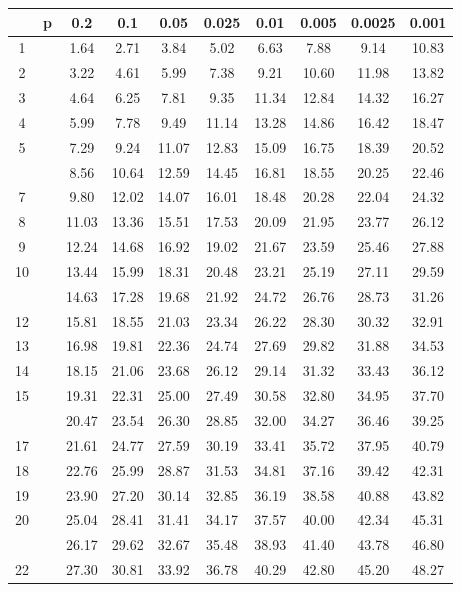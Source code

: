 \documentclass[
]{book}
\begin{document}
\begin{tabular}{cccccccccc}
\toprule
 & p & 0.2 & 0.1 & 0.05 & 0.025 & 0.01 & 0.005 & 0.0025 & 0.001\\
\midrule
1 &  & 1.64 & 2.71 & 3.84 & 5.02 & 6.63 & 7.88 & 9.14 & 10.83\\
2 &  & 3.22 & 4.61 & 5.99 & 7.38 & 9.21 & 10.60 & 11.98 & 13.82\\
3 &  & 4.64 & 6.25 & 7.81 & 9.35 & 11.34 & 12.84 & 14.32 & 16.27\\
4 &  & 5.99 & 7.78 & 9.49 & 11.14 & 13.28 & 14.86 & 16.42 & 18.47\\
5 &  & 7.29 & 9.24 & 11.07 & 12.83 & 15.09 & 16.75 & 18.39 & 20.52\\
\addlinespace
6 &  & 8.56 & 10.64 & 12.59 & 14.45 & 16.81 & 18.55 & 20.25 & 22.46\\
7 &  & 9.80 & 12.02 & 14.07 & 16.01 & 18.48 & 20.28 & 22.04 & 24.32\\
8 &  & 11.03 & 13.36 & 15.51 & 17.53 & 20.09 & 21.95 & 23.77 & 26.12\\
9 &  & 12.24 & 14.68 & 16.92 & 19.02 & 21.67 & 23.59 & 25.46 & 27.88\\
10 &  & 13.44 & 15.99 & 18.31 & 20.48 & 23.21 & 25.19 & 27.11 & 29.59\\
\addlinespace
11 &  & 14.63 & 17.28 & 19.68 & 21.92 & 24.72 & 26.76 & 28.73 & 31.26\\
12 &  & 15.81 & 18.55 & 21.03 & 23.34 & 26.22 & 28.30 & 30.32 & 32.91\\
13 &  & 16.98 & 19.81 & 22.36 & 24.74 & 27.69 & 29.82 & 31.88 & 34.53\\
14 &  & 18.15 & 21.06 & 23.68 & 26.12 & 29.14 & 31.32 & 33.43 & 36.12\\
15 &  & 19.31 & 22.31 & 25.00 & 27.49 & 30.58 & 32.80 & 34.95 & 37.70\\
\addlinespace
16 &  & 20.47 & 23.54 & 26.30 & 28.85 & 32.00 & 34.27 & 36.46 & 39.25\\
17 &  & 21.61 & 24.77 & 27.59 & 30.19 & 33.41 & 35.72 & 37.95 & 40.79\\
18 &  & 22.76 & 25.99 & 28.87 & 31.53 & 34.81 & 37.16 & 39.42 & 42.31\\
19 &  & 23.90 & 27.20 & 30.14 & 32.85 & 36.19 & 38.58 & 40.88 & 43.82\\
20 &  & 25.04 & 28.41 & 31.41 & 34.17 & 37.57 & 40.00 & 42.34 & 45.31\\
\addlinespace
21 &  & 26.17 & 29.62 & 32.67 & 35.48 & 38.93 & 41.40 & 43.78 & 46.80\\
22 &  & 27.30 & 30.81 & 33.92 & 36.78 & 40.29 & 42.80 & 45.20 & 48.27\\

\end{tabular}
\end{document}

